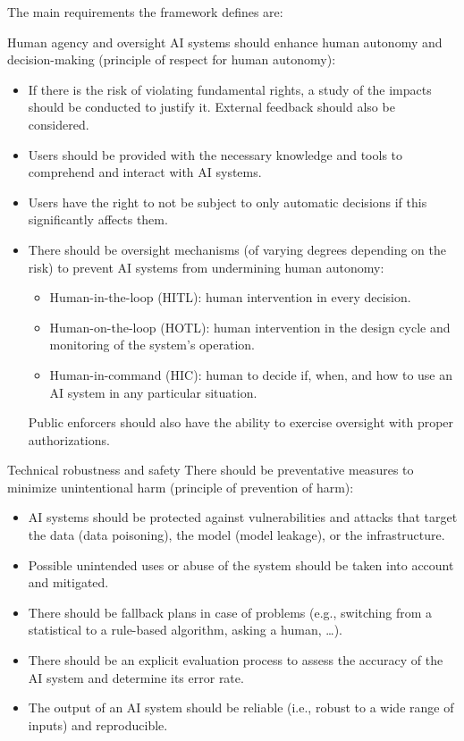 The main requirements the framework defines are:
\begin{descriptionlist}
    \item[Human agency and oversight] 
        AI systems should enhance human autonomy and decision-making (principle of respect for human autonomy):
        \begin{itemize}
            \item If there is the risk of violating fundamental rights, a study of the impacts should be conducted to justify it. External feedback should also be considered.
            \item Users should be provided with the necessary knowledge and tools to comprehend and interact with AI systems. 
            \item Users have the right to not be subject to only automatic decisions if this significantly affects them.
            \item There should be oversight mechanisms (of varying degrees depending on the risk) to prevent AI systems from undermining human autonomy:
            \begin{itemize}
                \item Human-in-the-loop (HITL): human intervention in every decision.
                \item Human-on-the-loop (HOTL): human intervention in the design cycle and monitoring of the system's operation.
                \item Human-in-command (HIC): human to decide if, when, and how to use an AI system in any particular situation.
            \end{itemize}
            Public enforcers should also have the ability to exercise oversight with proper authorizations.
        \end{itemize}

    \item[Technical robustness and safety] 
        There should be preventative measures to minimize unintentional harm (principle of prevention of harm):
        \begin{itemize}
            \item AI systems should be protected against vulnerabilities and attacks that target the data (data poisoning), the model (model leakage), or the infrastructure.
            \item Possible unintended uses or abuse of the system should be taken into account and mitigated.
            \item There should be fallback plans in case of problems (e.g., switching from a statistical to a rule-based algorithm, asking a human, \dots).
            \item There should be an explicit evaluation process to assess the accuracy of the AI system and determine its error rate.
            \item The output of an AI system should be reliable (i.e., robust to a wide range of inputs) and reproducible.
        \end{itemize}


\end{descriptionlist}
